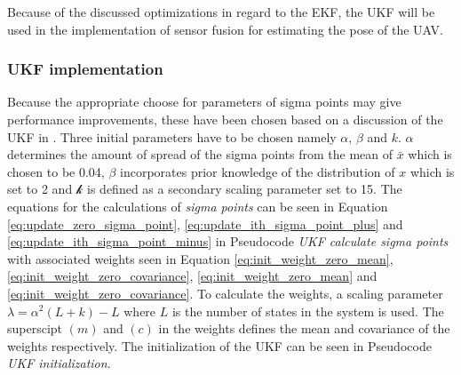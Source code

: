 \documentclass[../Head/report.tex]{subfiles}
\begin{document}
Because of the discussed optimizations in regard to the EKF, the UKF will be used in the implementation of sensor fusion for estimating the pose of the UAV. 

\subsubsection{UKF implementation}
\label{sec:ukf_implementation}

Because the appropriate choose for parameters of sigma points may give performance improvements, these have been chosen based on a discussion of the UKF in \cite[p.~354]{KalmanAndBayesianFiltersInPython}. Three initial parameters have to be chosen namely $\alpha$, $\beta$ and $k$. $\alpha$ determines the amount of spread of the sigma points from the mean of $\bar{x}$ which is chosen to be 0.04, $\beta$ incorporates prior knowledge of the distribution of $x$ which is set to 2 and $\mathcal{k}$ is defined as a secondary scaling parameter set to 15. The equations for the calculations of \textit{sigma points} can be seen in Equation \ref{eq:update_zero_sigma_point}, \ref{eq:update_ith_sigma_point_plus} and \ref{eq:update_ith_sigma_point_minus} in Pseudocode \textit{UKF calculate sigma points} with associated weights seen in Equation \ref{eq:init_weight_zero_mean}, \ref{eq:init_weight_zero_covariance}, \ref{eq:init_weight_zero_mean} and \ref{eq:init_weight_zero_covariance}. To calculate the weights, a scaling parameter $\lambda = \alpha^2(L+k)-L$ where $L$ is the number of states in the system is used. The superscipt $(m)$ and $(c)$ in the weights defines the mean and covariance of the weights respectively. The initialization of the UKF can be seen in Pseudocode \textit{UKF initialization}. 
\end{document}
